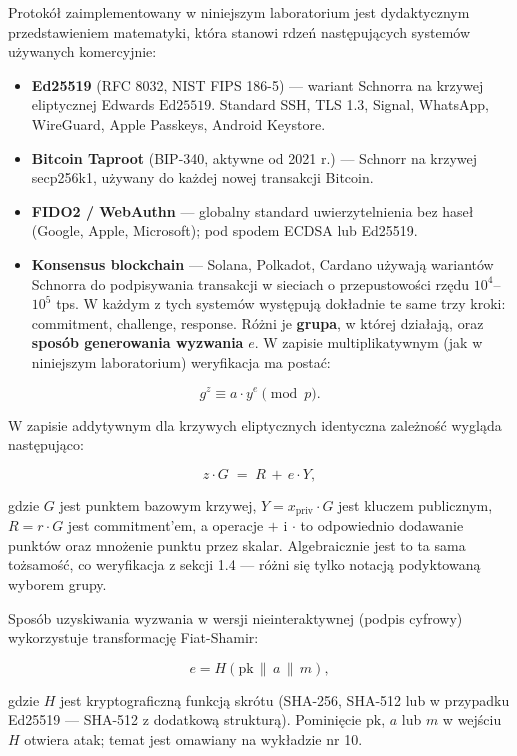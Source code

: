 \documentclass[
]{article}
\providecommand{\tightlist}{%
  \setlength{\itemsep}{0pt}\setlength{\parskip}{0pt}}
\begin{document}
Protokół zaimplementowany w niniejszym laboratorium jest dydaktycznym
przedstawieniem matematyki, która stanowi rdzeń następujących systemów
używanych komercyjnie:

\begin{itemize}
\tightlist
\item
  \textbf{Ed25519} (RFC 8032, NIST FIPS 186-5) --- wariant Schnorra na
  krzywej eliptycznej Edwards \(\mathrm{Ed}25519\). Standard SSH, TLS
  1.3, Signal, WhatsApp, WireGuard, Apple Passkeys, Android Keystore.
\item
  \textbf{Bitcoin Taproot} (BIP-340, aktywne od 2021 r.) --- Schnorr na
  krzywej secp256k1, używany do każdej nowej transakcji Bitcoin.
\item
  \textbf{FIDO2 / WebAuthn} --- globalny standard uwierzytelnienia bez
  haseł (Google, Apple, Microsoft); pod spodem ECDSA lub Ed25519.
\item
  \textbf{Konsensus blockchain} --- Solana, Polkadot, Cardano używają
  wariantów Schnorra do podpisywania transakcji w sieciach o
  przepustowości rzędu \(10^4\)--\(10^5\) tps. W każdym z tych systemów
  występują dokładnie te same trzy kroki: commitment, challenge,
  response. Różni je \textbf{grupa}, w której działają, oraz
  \textbf{sposób generowania wyzwania} \(e\). W zapisie multiplikatywnym
  (jak w niniejszym laboratorium) weryfikacja ma postać:
\end{itemize}

\[g^z \equiv a \cdot y^e \pmod{p}.\]

W zapisie addytywnym dla krzywych eliptycznych identyczna zależność
wygląda następująco:

\[z \cdot G \;=\; R \,+\, e \cdot Y,\]

gdzie \(G\) jest punktem bazowym krzywej,
\(Y = x_{\mathrm{priv}} \cdot G\) jest kluczem publicznym,
\(R = r \cdot G\) jest commitment'em, a operacje \(+\) i \(\cdot\) to
odpowiednio dodawanie punktów oraz mnożenie punktu przez skalar.
Algebraicznie jest to ta sama tożsamość, co weryfikacja z sekcji 1.4 ---
różni się tylko notacją podyktowaną wyborem grupy.

Sposób uzyskiwania wyzwania w wersji nieinteraktywnej (podpis cyfrowy)
wykorzystuje transformację Fiat-Shamir:

\[e = H(\mathrm{pk} \,\|\, a \,\|\, m),\]

gdzie \(H\) jest kryptograficzną funkcją skrótu (SHA-256, SHA-512 lub w
przypadku Ed25519 --- SHA-512 z dodatkową strukturą). Pominięcie
\(\mathrm{pk}\), \(a\) lub \(m\) w wejściu \(H\) otwiera atak; temat
jest omawiany na wykładzie nr 10.
\end{document}
